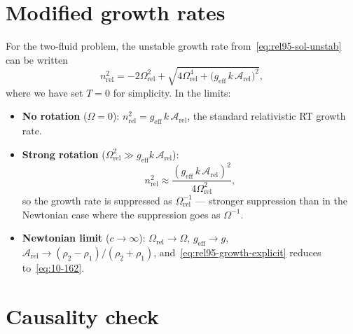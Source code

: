 \section{Modified growth rates}\label{sec:rel-95-growth}

For the two-fluid problem, the unstable growth rate
from~\eqref{eq:rel95-sol-unstab} can be written
\begin{equation}
  n_{\mathrm{rel}}^{2}
    = -2\Omega_{\mathrm{rel}}^{2}
      + \sqrt{4\Omega_{\mathrm{rel}}^{4}
        + \bigl(g_{\mathrm{eff}}\,k\,\mathcal{A}_{\mathrm{rel}}
          \bigr)^{2}},
  \label{eq:rel95-growth-explicit}
\end{equation}
where we have set $T=0$ for simplicity.  In the limits:

\begin{itemize}
\item \textbf{No rotation} ($\Omega=0$):
  $n_{\mathrm{rel}}^{2} = g_{\mathrm{eff}}\,k\,
  \mathcal{A}_{\mathrm{rel}}$, the standard relativistic RT growth
  rate.

\item \textbf{Strong rotation}
  ($\Omega_{\mathrm{rel}}^{2}\gg g_{\mathrm{eff}}k\,
  \mathcal{A}_{\mathrm{rel}}$):
  \begin{equation}
    n_{\mathrm{rel}}^{2}
      \approx \frac{(g_{\mathrm{eff}}\,k\,
        \mathcal{A}_{\mathrm{rel}})^{2}}
        {4\Omega_{\mathrm{rel}}^{2}},
    \label{eq:rel95-strong-rot}
  \end{equation}
  so the growth rate is suppressed as $\Omega_{\mathrm{rel}}^{-1}$
  --- stronger suppression than in the Newtonian case where the
  suppression goes as $\Omega^{-1}$.

\item \textbf{Newtonian limit} ($c\to\infty$):
  $\Omega_{\mathrm{rel}}\to\Omega$,
  $g_{\mathrm{eff}}\to g$,
  $\mathcal{A}_{\mathrm{rel}}\to(\rho_{2}-\rho_{1})/(\rho_{2}+\rho_{1})$,
  and~\eqref{eq:rel95-growth-explicit} reduces
  to~\eqref{eq:10-162}.
\end{itemize}

\section{Causality check}\label{sec:rel-95-causality}


